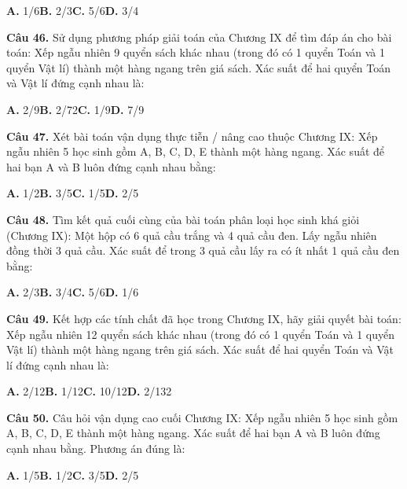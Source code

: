 \documentclass[11pt,a4paper]{article}
\begin{document}
\hspace*{1.5em}\textbf{A.} 1/6\quad\quad \textbf{B.} 2/3\quad\quad \textbf{C.} 5/6\quad\quad \textbf{D.} 3/4\par\vspace{2pt}
\textbf{\color{primary} Câu 46.} Sử dụng phương pháp giải toán của Chương IX để tìm đáp án cho bài toán: Xếp ngẫu nhiên 9 quyển sách khác nhau (trong đó có 1 quyển Toán và 1 quyển Vật lí) thành một hàng ngang trên giá sách. Xác suất để hai quyển Toán và Vật lí đứng cạnh nhau là:\par
\hspace*{1.5em}\textbf{A.} 2/9\quad\quad \textbf{B.} 2/72\quad\quad \textbf{C.} 1/9\quad\quad \textbf{D.} 7/9\par\vspace{2pt}
\textbf{\color{primary} Câu 47.} Xét bài toán vận dụng thực tiễn / nâng cao thuộc Chương IX: Xếp ngẫu nhiên 5 học sinh gồm A, B, C, D, E thành một hàng ngang. Xác suất để hai bạn A và B luôn đứng cạnh nhau bằng:\par
\hspace*{1.5em}\textbf{A.} 1/2\quad\quad \textbf{B.} 3/5\quad\quad \textbf{C.} 1/5\quad\quad \textbf{D.} 2/5\par\vspace{2pt}
\textbf{\color{primary} Câu 48.} Tìm kết quả cuối cùng của bài toán phân loại học sinh khá giỏi (Chương IX): Một hộp có 6 quả cầu trắng và 4 quả cầu đen. Lấy ngẫu nhiên đồng thời 3 quả cầu. Xác suất để trong 3 quả cầu lấy ra có ít nhất 1 quả cầu đen bằng:\par
\hspace*{1.5em}\textbf{A.} 2/3\quad\quad \textbf{B.} 3/4\quad\quad \textbf{C.} 5/6\quad\quad \textbf{D.} 1/6\par\vspace{2pt}
\textbf{\color{primary} Câu 49.} Kết hợp các tính chất đã học trong Chương IX, hãy giải quyết bài toán: Xếp ngẫu nhiên 12 quyển sách khác nhau (trong đó có 1 quyển Toán và 1 quyển Vật lí) thành một hàng ngang trên giá sách. Xác suất để hai quyển Toán và Vật lí đứng cạnh nhau là:\par
\hspace*{1.5em}\textbf{A.} 2/12\quad\quad \textbf{B.} 1/12\quad\quad \textbf{C.} 10/12\quad\quad \textbf{D.} 2/132\par\vspace{2pt}
\textbf{\color{primary} Câu 50.} Câu hỏi vận dụng cao cuối Chương IX: Xếp ngẫu nhiên 5 học sinh gồm A, B, C, D, E thành một hàng ngang. Xác suất để hai bạn A và B luôn đứng cạnh nhau bằng. Phương án đúng là:\par
\hspace*{1.5em}\textbf{A.} 1/5\quad\quad \textbf{B.} 1/2\quad\quad \textbf{C.} 3/5\quad\quad \textbf{D.} 2/5\par\vspace{2pt}
\end{document}

